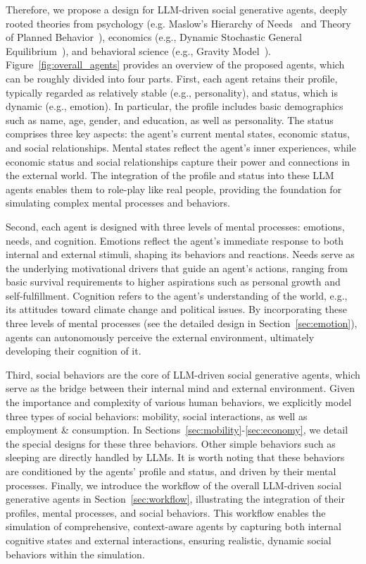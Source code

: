 Therefore, we propose a design for LLM-driven social generative agents, deeply rooted theories from psychology (e.g. Maslow's Hierarchy of Needs~\cite{maslow1943theory} and Theory of Planned Behavior~\cite{ajzen1991theory}), economics (e.g., Dynamic Stochastic General Equilibrium~\cite{christiano2005nominal}), and behavioral science (e.g., Gravity Model~\cite{zipf1946p}). Figure~\ref{fig:overall_agents} provides an overview of the proposed agents, which can be roughly divided into four parts. First, each agent retains their profile, typically regarded as relatively stable (e.g., personality), and status, which is dynamic (e.g., emotion). In particular, the profile includes basic demographics such as name, age, gender, and education, as well as personality. The status comprises three key aspects: the agent’s current mental states, economic status, and social relationships. Mental states reflect the agent’s inner experiences, while economic status and social relationships capture their power and connections in the external world. The integration of the profile and status into these LLM agents enables them to role-play like real people, providing the foundation for simulating complex mental processes and behaviors.

Second, each agent is designed with three levels of mental processes: emotions, needs, and cognition. Emotions reflect the agent’s immediate response to both internal and external stimuli, shaping its behaviors and reactions. Needs serve as the underlying motivational drivers that guide an agent’s actions, ranging from basic survival requirements to higher aspirations such as personal growth and self-fulfillment. Cognition refers to the agent’s understanding of the world, e.g., its attitudes toward climate change and political issues. By incorporating these three levels of mental processes (see the detailed design in Section~\ref{sec:emotion}), agents can autonomously perceive the external environment, ultimately developing their cognition of it. 

Third, social behaviors are the core of LLM-driven social generative agents, which serve as the bridge between their internal mind and external environment. Given the importance and complexity of various human behaviors, we explicitly model three types of social behaviors: mobility, social interactions, as well as employment \& consumption. In Sections~\ref{sec:mobility}-\ref{sec:economy}, we detail the special designs for these three behaviors. Other simple behaviors such as sleeping are directly handled by LLMs. It is worth noting that these behaviors are conditioned by the agents' profile and status, and driven by their mental processes. Finally, we introduce the workflow of the overall LLM-driven social generative agents in Section~\ref{sec:workflow}, illustrating the integration of their profiles, mental processes, and social behaviors. This workflow enables the simulation of comprehensive, context-aware agents by capturing both internal cognitive states and external interactions, ensuring realistic, dynamic social behaviors within the simulation.


